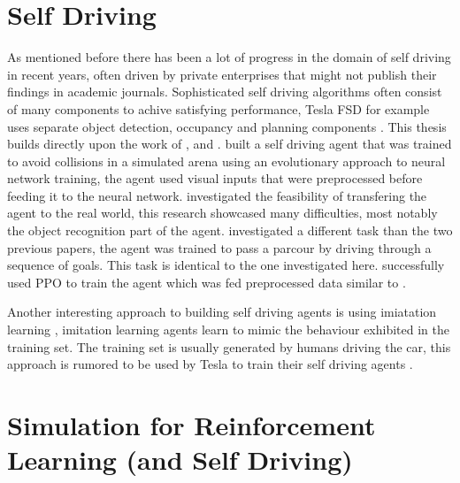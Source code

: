 \section{Self Driving}

As mentioned before there has been a lot of progress in the domain of self driving in recent years, often driven by private enterprises that might not publish their findings in academic journals. Sophisticated self driving algorithms often consist of many components to achive satisfying performance, Tesla FSD for example uses separate object detection, occupancy and planning components \autocite{teslaEndToEnd}.
This thesis builds directly upon the work of \autocite{jonas_koenig}, \autocite{merlin_flach} and \autocite{maximilian}. \autocite{jonas_koenig} built a self driving agent that was trained to avoid collisions in a simulated arena using an evolutionary approach to neural network training, the agent used visual inputs that were preprocessed before feeding it to the neural network. \autocite{merlin_flach} investigated the feasibility of transfering the agent to the real world, this research showcased many difficulties, most notably the object recognition part of the agent. \autocite{maximilian} investigated a different task than the two previous papers, the agent was trained to pass a parcour by driving through a sequence of goals. This task is identical to the one investigated here. \autocite{maximilian} successfully used PPO to train the agent which was fed preprocessed data similar to \autocite{jonas_koenig}.

Another interesting approach to building self driving agents is using imiatation learning \autocite{imitation_learning}, imitation learning agents learn to mimic the behaviour exhibited in the training set. The training set is usually generated by humans driving the car, this approach is rumored to be used by Tesla to train their self driving agents \autocite{teslaEndToEnd}.









\section{Simulation for Reinforcement Learning (and Self Driving)}


